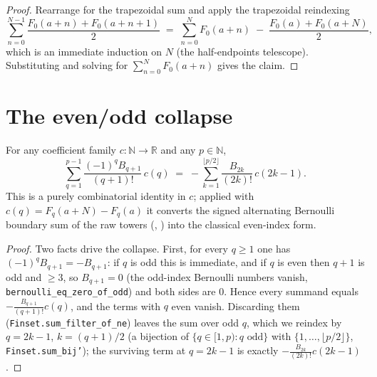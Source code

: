 \begin{proof}
\leanok
{}
Rearrange  for the trapezoidal sum and apply the trapezoidal
reindexing
\[
  \sum_{n=0}^{N-1} \frac{F_0(a+n)+F_0(a+n+1)}{2}
    \;=\; \sum_{n=0}^{N} F_0(a+n) \;-\; \frac{F_0(a)+F_0(a+N)}{2},
\]
which is an immediate induction on $N$ (the half-endpoints telescope). Substituting and
solving for $\sum_{n=0}^{N} F_0(a+n)$ gives the claim.
\end{proof}

\section{The even/odd collapse}
\label{sec:em_collapse}

\begin{lemma}
\label{lem:bernoulli_even_collapse}
\leanok
{}
For any coefficient family $c : \mathbb{N} \to \mathbb{R}$ and any $p \in \mathbb{N}$,
\[
  \sum_{q=1}^{p-1} \frac{(-1)^{q} B_{q+1}}{(q+1)!}\, c(q)
  \;=\; -\sum_{k=1}^{\lfloor p/2 \rfloor} \frac{B_{2k}}{(2k)!}\, c(2k-1).
\]
This is a purely combinatorial identity in $c$; applied with
$c(q) = F_q(a+N) - F_q(a)$ it converts the signed alternating Bernoulli boundary sum of
the raw towers (, ) into the classical
even-index form.
\end{lemma}

\begin{proof}
\leanok
{}
Two facts drive the collapse. First, for every $q \ge 1$ one has
$(-1)^q B_{q+1} = -B_{q+1}$: if $q$ is odd this is immediate, and if $q$ is even then
$q+1$ is odd and $\ge 3$, so $B_{q+1} = 0$ (the odd-index Bernoulli numbers vanish,
\texttt{bernoulli\_eq\_zero\_of\_odd}) and both sides are $0$. Hence every summand equals
$-\frac{B_{q+1}}{(q+1)!}c(q)$, and the terms with $q$ even vanish. Discarding them
(\texttt{Finset.sum\_filter\_of\_ne}) leaves the sum over odd $q$, which we reindex by
$q = 2k-1$, $k = (q+1)/2$ (a bijection of $\{q \in [1,p) : q \text{ odd}\}$ with
$\{1, \dots, \lfloor p/2\rfloor\}$, \texttt{Finset.sum\_bij'}); the surviving term at
$q = 2k-1$ is exactly $-\frac{B_{2k}}{(2k)!}c(2k-1)$.
\end{proof}

